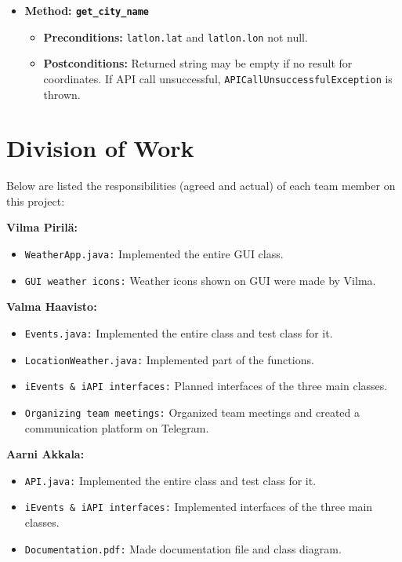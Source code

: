 \documentclass[a4paper,10pt]{article}
\begin{document}
\begin{itemize}
    \item \textbf{Method: \texttt{get\_city\_name}}
    \begin{itemize}
        \item \textbf{Preconditions:} \texttt{latlon.lat} and \texttt{latlon.lon} not null.
        \item \textbf{Postconditions:} Returned string may be empty if no result for coordinates. If API call unsuccessful, \texttt{APICallUnsuccessfulException} is thrown.
    \end{itemize}
\end{itemize}




\section{Division of Work}

Below are listed the responsibilities (agreed and actual) of each team member on this project:

\textbf{Vilma Pirilä:}
\begin{itemize}
    \item \texttt{WeatherApp.java:} Implemented the entire GUI class.
    \item \texttt{GUI weather icons:} Weather icons shown on GUI were made by Vilma.
\end{itemize}

\textbf{Valma Haavisto:}
\begin{itemize}
    \item \texttt{Events.java:} Implemented the entire class and test class for it.
    \item \texttt{LocationWeather.java:} Implemented part of the functions.
    \item \texttt{iEvents \& iAPI interfaces:} Planned interfaces of the three main classes.
    \item \texttt{Organizing team meetings:} Organized team meetings and created a communication platform on Telegram.
\end{itemize}

\textbf{Aarni Akkala:}
\begin{itemize}
    \item \texttt{API.java:} Implemented the entire class and test class for it.
    \item \texttt{iEvents \& iAPI interfaces:} Implemented interfaces of the three main classes.
    \item \texttt{Documentation.pdf:} Made documentation file and class diagram.
\end{itemize}
\end{document}
